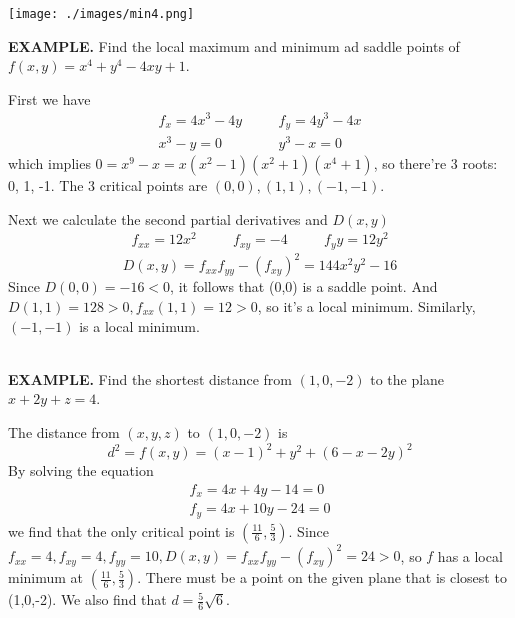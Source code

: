 \documentclass{article}
\begin{document}
\begin{minipage}[]{0.3\linewidth}
  \texttt{[image: ./images/min4.png]}
  
\end{minipage}
\begin{minipage}[]{0.67\linewidth}
{\selectfont \textbf{\textcolor{blue5}{ EXAMPLE.}}} Find the local maximum and minimum ad saddle points of $f(x,y) = x^4 + y^4 - 4xy + 1$.

First we have 
\begin{align*}
  f_x = 4x^3 - 4y & \quad & f_y = 4y^3 - 4x \\
  x^3 - y = 0 & \quad & y^3 - x = 0 
\end{align*}
which implies $0 = x^9 - x = x(x^2 - 1)(x^2 + 1)(x^4  + 1 )$, so there're 3 roots: 0, 1, -1. The 3 critical points are $(0,0), (1,1), (-1, -1)$.

Next we calculate the second partial derivatives and $D(x,y)$
\begin{align*}
  f_{xx} = 12x^2 & \quad & f_{xy} = -4 & \quad & f_yy = 12y^2 
\end{align*}
\[D(x,y) = f_{xx}f_{yy} - (f_{xy})^2 = 144 x^2 y^2 - 16 \]
Since $D(0,0) = -16 < 0$, it follows that (0,0) is a saddle point. And $D(1,1) = 128 >0, f_{xx}(1,1) = 12 > 0$, so it's a local minimum. Similarly, $(-1,-1)$ is a local minimum.
  
\end{minipage}\\
{\selectfont \textbf{\textcolor{blue5}{ EXAMPLE.}}} Find the shortest distance from $(1,0,-2)$ to the plane $x + 2y + z = 4 $.

The distance from $(x,y,z )$ to $(1,0,-2 )$ is 
\[d^2 = f(x,y) = (x - 1)^2 + y^2 + (6-x-2y)^2   \]
By solving the equation 
\begin{align*}
  f_x = 4x + 4y -  14 = 0 \\
  f_y = 4x + 10y - 24 = 0 
\end{align*}
we find that the only critical point is $\left( \frac{11 }{6 }, \frac{5 }{3 } \right)$. Since $f_{xx} = 4, f_{xy} = 4, f_{yy} = 10 , D(x,y) = f_{xx}f_{yy} - (f_{xy})^2 = 24 > 0 $, so $f$ has a local minimum at $\left( \frac{11 }{6 }, \frac{5 }{3 } \right)$. There must be a point on the given plane that is closest to (1,0,-2). We also find that $d = \frac{5 }{6 } \sqrt{6 }$.
\end{document}
